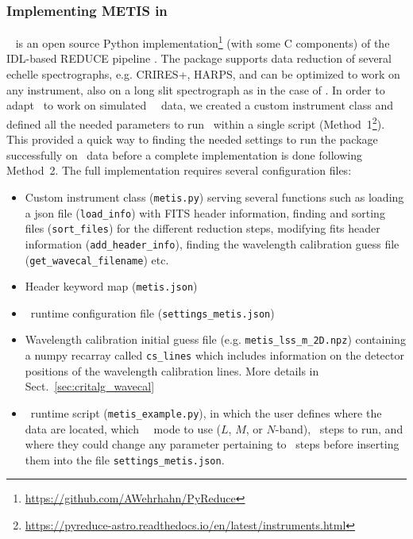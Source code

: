 \subsubsection{Implementing METIS in \pyred}\label{sec:pyred_mic}
\pyred~\cite{pis21} is an  open source Python implementation\footnote{\url{https://github.com/AWehrhahn/PyReduce}} (with some C components)  of the IDL-based REDUCE pipeline \cite{pis02}.  The package supports data reduction of several echelle spectrographs, e.g. CRIRES+,  HARPS, and can be optimized to work on any instrument, also on a  long slit spectrograph as in the case of \met. In order to adapt \pyred~to work on simulated \met~\lss~data, we created a custom instrument class  and defined all the needed parameters to run \pyred~within a single script (Method~1\footnote{\url{https://pyreduce-astro.readthedocs.io/en/latest/instruments.html}}). This provided a quick way to finding the needed settings to  run the package successfully on \met~data before a complete implementation is done following Method~2. The full implementation requires several configuration files: 
\begin{itemize}
\item Custom instrument class (\texttt{metis.py}) serving several functions such as loading a json file (\texttt{load\_info}) with FITS header information, finding  and sorting files (\texttt{sort\_files}) for the different reduction steps, modifying fits header information (\texttt{add\_header\_info}), finding the wavelength calibration guess file (\texttt{get\_wavecal\_filename}) etc.
\item Header keyword map (\texttt{metis.json})
\item \pyred~runtime configuration file (\texttt{settings\_metis.json}) 
\item Wavelength calibration initial guess  file (e.g. \texttt{metis\_lss\_m\_2D.npz}) containing a numpy recarray called \texttt{cs\_lines} which includes information on the detector positions of the wavelength calibration lines.
 More details in Sect.~\ref{sec:critalg_wavecal}
\item \pyred~runtime script (\texttt{metis\_example.py}), in which the user defines where the data are located, which \met~\lss~mode to use ($L$, $M$, or $N$-band), \pyred~steps to run, and where they could change any parameter pertaining to \pyred~steps before inserting them into the file \texttt{settings\_metis.json}.
\end{itemize}

